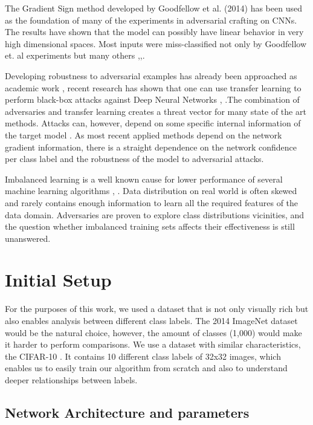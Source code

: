 \documentclass[runningheads,a4paper]{llncs}
\begin{document}
The Gradient Sign method developed by Goodfellow et al. (2014) has been used as the foundation of many of the experiments in adversarial crafting on CNNs. The results have shown that the model can possibly have linear behavior in very high dimensional spaces.  Most inputs were miss-classified not only by Goodfellow et. al \cite{goodfellow2014}  experiments but many others \cite{billovits},\cite{goodfellow2016},\cite{papernot2016}.

Developing robustness to adversarial examples has already been approached as academic work \cite{billovits}, recent research has shown that one can use transfer learning to perform black-box attacks against Deep Neural Networks \cite{yosinski2014transferable} , \cite{papernot2016} .The combination of adversaries and transfer learning creates a threat vector for many state of the art methods. Attacks can, however, depend on some specific internal information of the target model \cite{papernot2016transf}. As most recent applied methods depend on the network gradient information, there is a straight dependence on the network confidence per class label and the robustness of the model to adversarial attacks.

Imbalanced learning is a well known cause for lower performance of several machine learning algorithms \cite{japkowicz2002class}, \cite{krawczyk2016learning}. Data distribution on real world is often skewed and rarely contains enough information to learn all the required features of the data domain. Adversaries are proven to explore class distributions vicinities, and the question whether imbalanced training sets affects their effectiveness is still unanswered.


\section{Initial Setup}

For the purposes of this work, we used a dataset that is not only visually rich but also enables analysis between different class labels. The 2014 ImageNet dataset \cite{deng2009imagenet} would be the natural choice, however, the amount of classes (1,000) would make it harder to perform comparisons. We use a dataset with similar characteristics, the CIFAR-10 \cite{krizhevsky_2009}. It contains 10 different class labels of 32x32 images, which enables us to easily train our algorithm from scratch and also to understand deeper relationships between labels.
\subsection{Network Architecture and parameters}
\end{document}
